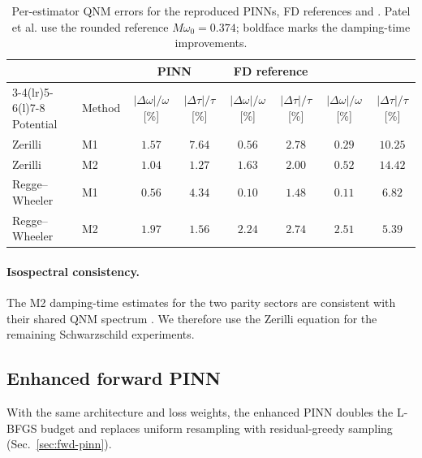 \begin{table}[!htbp]
\centering
\caption{Per-estimator QNM errors for the reproduced PINNs, FD
references and \citet[Table~3]{Patel2024pinn}. Patel et al. use the
rounded reference $M\omega_0=0.374$; boldface marks the damping-time
improvements.}
\label{tab:repro-qnm}
\footnotesize
\setlength{\tabcolsep}{3pt}
\renewcommand{\arraystretch}{1.15}
\begin{tabular}{@{}llcccccc@{}}
\toprule
 & & \multicolumn{2}{c}{PINN} & \multicolumn{2}{c}{FD reference}
 & \multicolumn{2}{c}{\citet{Patel2024pinn}} \\
\cmidrule(lr){3-4}\cmidrule(lr){5-6}\cmidrule(l){7-8}
Potential & Method & $|\Delta\omega|/\omega$ [\%] & $|\Delta\tau|/\tau$ [\%]
 & $|\Delta\omega|/\omega$ [\%] & $|\Delta\tau|/\tau$ [\%]
 & $|\Delta\omega|/\omega$ [\%] & $|\Delta\tau|/\tau$ [\%] \\
\midrule
Zerilli & M1 & $1.57$ & $7.64$ & $0.56$ & $2.78$ & $0.29$ & $10.25$ \\
Zerilli & M2 & $1.04$ & $\mathbf{1.27}$ & $1.63$ & $2.00$ & $0.52$ & $14.42$ \\
Regge--Wheeler & M1 & $0.56$ & $4.34$ & $0.10$ & $1.48$ & $0.11$ & $6.82$ \\
Regge--Wheeler & M2 & $1.97$ & $\mathbf{1.56}$ & $2.24$ & $2.74$ & $2.51$ & $5.39$ \\
\bottomrule
\end{tabular}
\end{table}

\paragraph{Isospectral consistency.} The M2 damping-time estimates
for the two parity sectors are consistent with their shared QNM spectrum
\citep{Chandrasekhar1975}. We therefore use the Zerilli equation for
the remaining Schwarzschild experiments.

\FloatBarrier

\subsection{Enhanced forward PINN}
\label{sec:res-fwd}

With the same architecture and loss weights, the enhanced PINN doubles
the L-BFGS budget and replaces uniform resampling with
residual-greedy sampling (Sec.~\ref{sec:fwd-pinn}).

